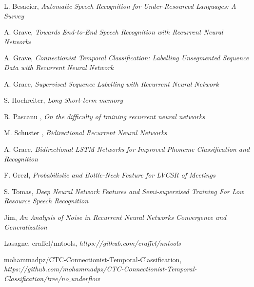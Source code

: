 \documentclass[conference]{IEEEtran}
\begin{document}
\begin{thebibliography}{1}

 L. Besacier, {\it Automatic Speech Recognition for Under-Resourced Languages: A Survey}

 A. Grave, {\it Towards End-to-End Speech Recognition
with Recurrent Neural Networks}

 A. Grave, {\it Connectionist Temporal Classification: Labelling Unsegmented Sequence Data with Recurrent Neural Network}

 A. Grace, {\it Supervised Sequence Labelling with Recurrent Neural Network}

 S. Hochreiter, {\it Long Short-term memory}

 R. Pascanu , {\it On the difficulty of training recurrent neural networks}

 M. Schuster , {\it Bidirectional Recurrent Neural Networks}

 A. Grace, {\it Bidirectional LSTM Networks for Improved Phoneme Classification and Recognition}

 F. Grezl, {\it Probabilistic and Bottle-Neck Feature for LVCSR of Meetings}

 S. Tomas, {\it Deep Neural Network Features and Semi-supervised Training For Low Resource Speech Recognition}

 Jim, {\it An Analysis of Noise in Recurrent Neural Networks Convergence and Generalization}

 Lasagne, craffel/nntools, {\it https://github.com/craffel/nntools}

 mohammadpz/CTC-Connectionist-Temporal-Classification, {\it https://github.com/mohammadpz/CTC-Connectionist-Temporal-Classification/tree/no$\_$underflow }

\end{thebibliography}
\end{document}

